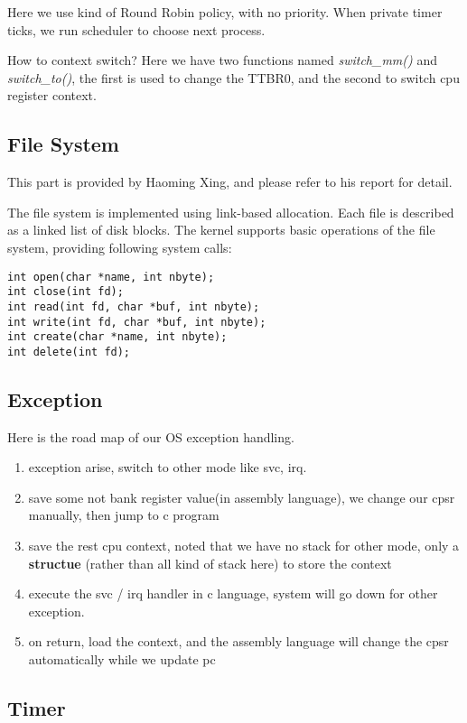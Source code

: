 \documentclass[12pt]{article}
\begin{document}
Here we use kind of Round Robin policy, with no priority. When private timer ticks, we run scheduler to choose next process.

How to context switch? Here we have two functions named \emph{switch\_mm()} and \emph{switch\_to()}, the first is used to change the TTBR0, and the second to switch cpu register context.

\subsection{File System}

This part is provided by Haoming Xing, and please refer to his report for detail.

The file system is implemented using link-based allocation. Each file is described as a linked list of disk blocks. The kernel supports basic operations of the file system, providing following system calls:

\begin{lstlisting}
int open(char *name, int nbyte);
int close(int fd);
int read(int fd, char *buf, int nbyte);
int write(int fd, char *buf, int nbyte);
int create(char *name, int nbyte);
int delete(int fd);
\end{lstlisting}


\subsection{Exception}

Here is the road map of our OS exception handling.

\begin{enumerate}
	\item	exception arise, switch to other mode like svc, irq.
	\item	save some not bank register value(in assembly language), we change our cpsr manually, then jump to c program
	\item	save the rest cpu context, noted that we have no stack for other mode, only a \textbf{structue} (rather than all kind of stack here) to store the context
	\item	execute the svc / irq handler in c language, system will go down for other exception.
	\item	on return, load the context, and the assembly language will change the cpsr automatically while we update pc
\end{enumerate}

\subsection{Timer}
\end{document}
